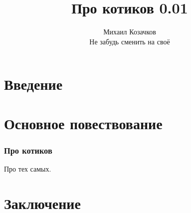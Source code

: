 \documentclass[12pt,oneside,openright,a4paper]{memoir}
\begin{document}
\mainmatter

\title{Про котиков 0.01}
\author{Михаил Козачков\\Не забудь сменить на своё}
\maketitle
\newpage

\renewcommand{\contentsname}{Содержание}
\tableofcontents
\newpage

\part{Введение}

\newpage

\part{Основное повествование}

\section{Про котиков}

Про тех самых.



\newpage

\part{Заключение}
\end{document}
